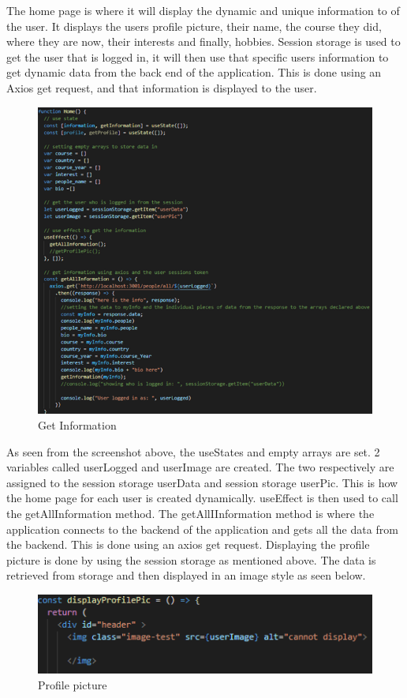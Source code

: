 The home page is where it will display the dynamic and unique information to of the user. It displays the users profile picture, their name, the course they did, where they are now, their interests and finally, hobbies. Session storage is used to get the user that is logged in, it will then use that specific users information to get dynamic data from the back end of the application. This is done using an Axios get request, and that information is displayed to the user. \\
\begin{figure}[H]
    \centering
    \includegraphics{img/home 4.png}
    \caption{Get Information}
    \label{fig:my_label}
\end{figure}


As seen from the screenshot above, the useStates and empty arrays are set. 2 variables called userLogged and userImage are created. The two respectively are assigned to the session storage userData and session storage userPic. This is how the home page for each user is created dynamically. useEffect is then used to call the getAllInformation method. The getAllIInformation method is where the application connects to the backend of the application and gets all the data from the backend. This is done using an axios get request. Displaying the profile picture is done by using the session storage as mentioned above. The data is retrieved from storage and then displayed in an image style as seen below. \\
\begin{figure}[H]
    \centering
    \includegraphics{img/home 5.png}
    \caption{Profile picture}
    \label{fig:my_label}
\end{figure}

